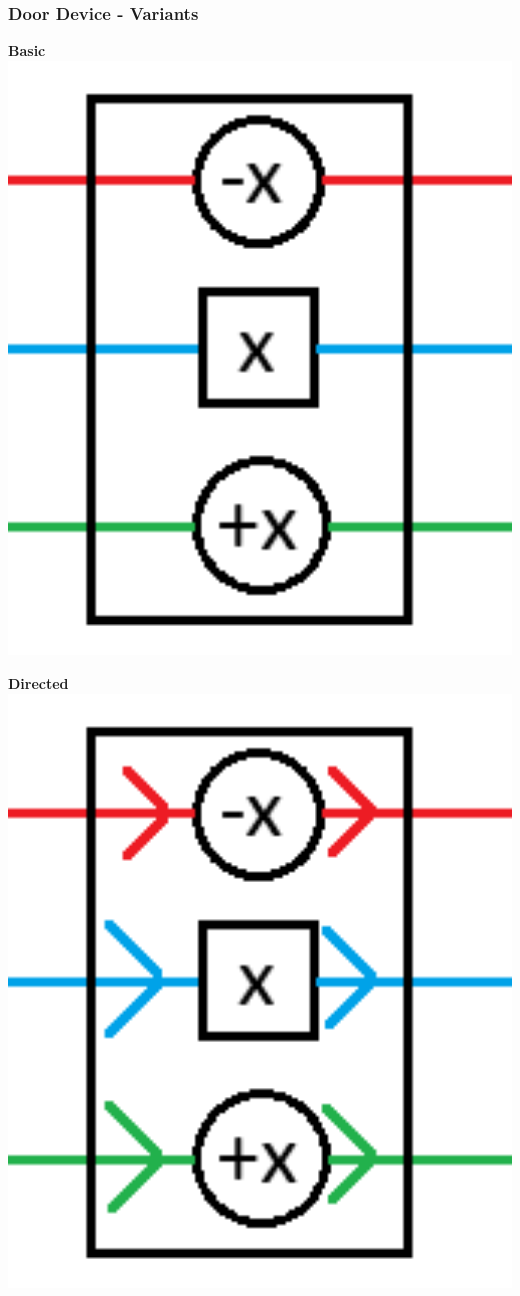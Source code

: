 \documentclass{beamer}
\begin{document}
\begin{frame}
  \frametitle{Door Device - Variants}
  \begin{minipage}[t]{0.32\textwidth}
    \textbf{Basic}
    \includegraphics[width=1\textwidth]{res/DoorNormal.png}
  \end{minipage}
  \begin{minipage}[t]{0.32\textwidth}
    \textbf{Directed}
    \includegraphics[width=1\textwidth]{res/DoorDirected.png}

\end{minipage}
\end{frame}
\end{document}
